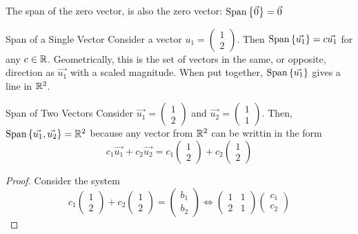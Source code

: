 The span of the zero vector, is also the zero vector: $\text{Span}\left\{\vec{0} \right\} = \vec{0}$

\begin{example}{Span of a Single Vector}{}
    Consider a vector $u_1 = \begin{pmatrix} 1 \\ 2 \end{pmatrix}$. Then $\text{Span}\left\{\vec{u_1} \right\} = c\vec{u_1}$ for any $c \in \mathbb R$. Geometrically, this is the set of vectors in the same, or opposite, direction as $\vec{u_1}$ with a scaled magnitude. When put together, $\text{Span}\left\{\vec{u_1} \right\}$ gives a line in $\mathbb R^{2}$.
\end{example}

\begin{example}{Span of Two Vectors}{}
    Consider $\vec{u_1} = \begin{pmatrix} 1 \\ 2 \end{pmatrix}$ and $\vec{u_2} = \begin{pmatrix} 1 \\ 1 \end{pmatrix}$. Then, $\text{Span}\left\{\vec{u_1}, \vec{u_2} \right\} = \mathbb R^{2}$ because any vector from $\mathbb R^2$ can be writtin in the form 
    \[
        c_1\vec{u_1} + c_2\vec{u_2} = c_1\begin{pmatrix} 1 \\ 2 \end{pmatrix} + c_2\begin{pmatrix} 1 \\ 2 \end{pmatrix}
    \]
    \begin{proof}
        Consider the system 
        \[
            c_1\begin{pmatrix} 1 \\ 2 \end{pmatrix} + c_2\begin{pmatrix} 1 \\ 2 \end{pmatrix} = \begin{pmatrix} b_1 \\ b_2 \end{pmatrix} 
            \Leftrightarrow 
            \begin{pmatrix}
                1 & 1 \\
                2 & 1
            \end{pmatrix}
            \begin{pmatrix}
                c_1 \\ c_2

\end{pmatrix}\]
\end{proof}
\end{example}
